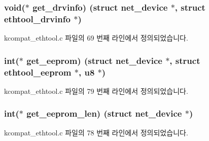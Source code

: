 \subsubsection[{\texorpdfstring{get\+\_\+drvinfo}{get_drvinfo}}]{\setlength{\rightskip}{0pt plus 5cm}void($\ast$ get\+\_\+drvinfo) (struct net\+\_\+device $\ast$, struct {\bf ethtool\+\_\+drvinfo} $\ast$)}\hypertarget{struct__kc__ethtool__ops_a177848d9f3e535d7a5ae880ae8a3f5b5}{}\label{struct__kc__ethtool__ops_a177848d9f3e535d7a5ae880ae8a3f5b5}


kcompat\+\_\+ethtool.\+c 파일의 69 번째 라인에서 정의되었습니다.

\subsubsection[{\texorpdfstring{get\+\_\+eeprom}{get_eeprom}}]{\setlength{\rightskip}{0pt plus 5cm}int($\ast$ get\+\_\+eeprom) (struct net\+\_\+device $\ast$, struct {\bf ethtool\+\_\+eeprom} $\ast$, {\bf u8} $\ast$)}\hypertarget{struct__kc__ethtool__ops_ae5fbeffc7284c796e26e8fc8dba287f5}{}\label{struct__kc__ethtool__ops_ae5fbeffc7284c796e26e8fc8dba287f5}


kcompat\+\_\+ethtool.\+c 파일의 79 번째 라인에서 정의되었습니다.

\subsubsection[{\texorpdfstring{get\+\_\+eeprom\+\_\+len}{get_eeprom_len}}]{\setlength{\rightskip}{0pt plus 5cm}int($\ast$ get\+\_\+eeprom\+\_\+len) (struct net\+\_\+device $\ast$)}\hypertarget{struct__kc__ethtool__ops_a420a9ceaead25258ac805b4a03d3b0ec}{}\label{struct__kc__ethtool__ops_a420a9ceaead25258ac805b4a03d3b0ec}


kcompat\+\_\+ethtool.\+c 파일의 78 번째 라인에서 정의되었습니다.

